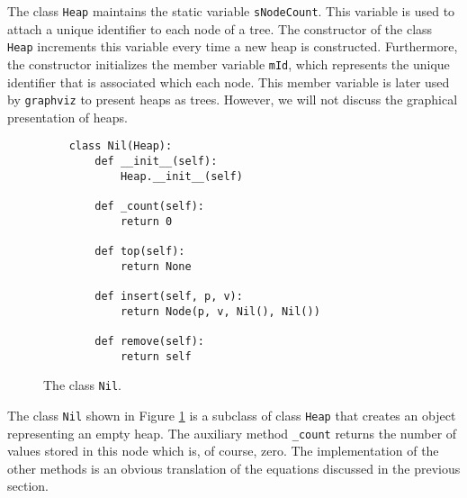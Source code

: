 The class \texttt{Heap} maintains the static variable \texttt{sNodeCount}.  This variable is used to attach a
unique identifier to each node of a tree.  The constructor of the class \texttt{Heap} increments this variable
every time a new heap is constructed.  Furthermore, the constructor initializes the member variable
\texttt{mId}, which represents the unique identifier that is associated which each node.  This member variable
is later used by \texttt{graphviz} to present heaps as trees.  However, we will not discuss the graphical
presentation of heaps.

\begin{figure}[!ht]
\centering
\begin{verbatim}
    class Nil(Heap):
        def __init__(self):
            Heap.__init__(self)
    
        def _count(self):
            return 0

        def top(self):
            return None

        def insert(self, p, v):
            return Node(p, v, Nil(), Nil())   

        def remove(self):
            return self
\end{verbatim}
\vspace*{-0.3cm}
\caption{The class \texttt{Nil}.}
\label{fig:Heap.ipynb:Nil}
\end{figure}

The class \texttt{Nil} shown in Figure \ref{fig:Heap.ipynb:Nil} is a subclass of class \texttt{Heap}
that creates an object representing an empty heap.
The auxiliary method \texttt{\_count} returns the number of values stored in this node which is, of course,
zero.  The implementation of the other methods is an obvious translation of the equations discussed in the
previous section.

